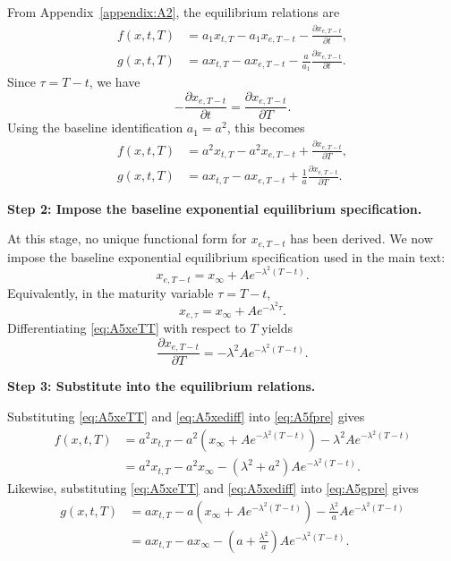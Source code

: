 \documentclass[12pt]{article}
\theoremstyle{statementstyle}
\begin{document}
\begin{appendices}
From Appendix~\ref{appendix:A2}, the equilibrium relations are
\begin{align}
f(x,t,T)
&=
a_1 x_{t,T}
-
a_1 x_{e,T-t}
-
\frac{\partial x_{e,T-t}}{\partial t},
\tag{A.5.1a}\label{eq:A5eqdrift}
\\[0.4em]
g(x,t,T)
&=
a x_{t,T}
-
a x_{e,T-t}
-
\frac{a}{a_1}\frac{\partial x_{e,T-t}}{\partial t}.
\tag{A.5.1b}\label{eq:A5eqdiff}
\end{align}
Since \(\tau=T-t\), we have
\[
-\frac{\partial x_{e,T-t}}{\partial t}
=
\frac{\partial x_{e,T-t}}{\partial T}.
\]
Using the baseline identification \(a_1=a^2\), this becomes
\begin{align}
f(x,t,T)
&=
a^{2}x_{t,T}
-
a^{2}x_{e,T-t}
+
\frac{\partial x_{e,T-t}}{\partial T},
\tag{A.5.2a}\label{eq:A5fpre}
\\[0.4em]
g(x,t,T)
&=
a x_{t,T}
-
a x_{e,T-t}
+
\frac{1}{a}\frac{\partial x_{e,T-t}}{\partial T}.
\tag{A.5.2b}\label{eq:A5gpre}
\end{align}

\medskip
\noindent\textbf{Step 2: Impose the baseline exponential equilibrium specification.}

At this stage, no unique functional form for \(x_{e,T-t}\) has been
derived. We now impose the baseline exponential equilibrium specification
used in the main text:
\begin{equation}
x_{e,T-t}
=
x_{\infty}+A e^{-\lambda^{2}(T-t)}.
\tag{A.5.3}\label{eq:A5xeTT}
\end{equation}
Equivalently, in the maturity variable \(\tau=T-t\),
\begin{equation}
x_{e,\tau}=x_{\infty}+A e^{-\lambda^{2}\tau}.
\tag{A.5.4}\label{eq:A5xe}
\end{equation}
Differentiating \eqref{eq:A5xeTT} with respect to \(T\) yields
\begin{equation}
\frac{\partial x_{e,T-t}}{\partial T}
=
-\lambda^{2}A e^{-\lambda^{2}(T-t)}.
\tag{A.5.5}\label{eq:A5xediff}
\end{equation}

\medskip
\noindent\textbf{Step 3: Substitute into the equilibrium relations.}

Substituting \eqref{eq:A5xeTT} and \eqref{eq:A5xediff} into
\eqref{eq:A5fpre} gives
\begin{align}
f(x,t,T)
&=
a^{2}x_{t,T}
-
a^{2}\!\left(x_{\infty}+A e^{-\lambda^{2}(T-t)}\right)
-
\lambda^{2}A e^{-\lambda^{2}(T-t)}
\nonumber\\
&=
a^{2}x_{t,T}
-
a^{2}x_{\infty}
-
(\lambda^{2}+a^{2})A e^{-\lambda^{2}(T-t)}.
\tag{A.5.6}\label{eq:A51}
\end{align}
Likewise, substituting \eqref{eq:A5xeTT} and \eqref{eq:A5xediff} into
\eqref{eq:A5gpre} gives
\begin{align}
g(x,t,T)
&=
a x_{t,T}
-
a\!\left(x_{\infty}+A e^{-\lambda^{2}(T-t)}\right)
-
\frac{\lambda^{2}}{a}A e^{-\lambda^{2}(T-t)}
\nonumber\\
&=
a x_{t,T}
-
a x_{\infty}
-
\left(a+\frac{\lambda^{2}}{a}\right)
A e^{-\lambda^{2}(T-t)}.
\tag{A.5.7}\label{eq:A52}
\end{align}


\end{appendices}
\end{document}
